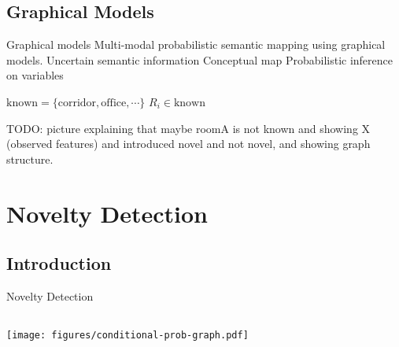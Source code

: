 \documentclass[compress]{beamer}
\begin{document}
\subsection{Graphical Models}
\begin{frame}{Graphical models}
    Multi-modal probabilistic semantic mapping using graphical models.
    Uncertain semantic information
    Conceptual map
    Probabilistic inference on variables

            $\text{known} = \{\text{corridor}, \text{office}, \cdots\}$
            $R_i \in \text{known}$

    TODO: picture explaining that maybe roomA is not known and showing X (observed features) and introduced novel and not novel, and showing graph structure.

\end{frame}

\section{Novelty Detection}
\subsection{Introduction}
\begin{frame}{Novelty Detection}
    \begin{columns}[c]
        \centering
        \texttt{[image: figures/conditional-prob-graph.pdf]}

    \end{columns}
\end{frame}
\end{document}

